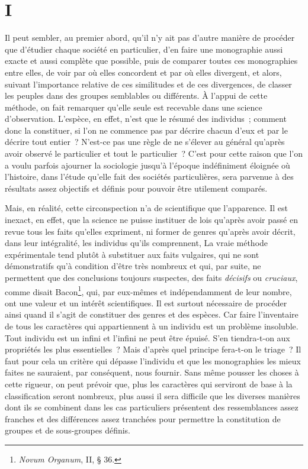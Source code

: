 \documentclass[french,twoside]{book} %
\begin{document}
\section[{I}]{I}
\noindent Il peut sembler, au premier abord, qu’il n’y ait pas d’autre manière de procéder que d’étudier chaque société en particulier, d’en faire une monographie aussi exacte et aussi complète que possible, puis de comparer toutes ces monographies entre elles, de voir par où elles concordent et par où elles divergent, et alors, suivant l’importance relative de ces similitudes et de ces divergences, de classer les peuples dans des groupes semblables ou différents. À l’appui de cette méthode, on fait remarquer qu’elle seule est recevable dans une science d’observation. L’espèce, en effet, n’est que le résumé des individus ; comment donc la constituer, si l’on ne commence pas par décrire chacun d’eux et par le décrire tout entier ? N’est-ce pas une règle de ne s’élever au général qu’après avoir observé le particulier et tout le particulier ? C’est pour cette raison que l’on a voulu parfois ajourner la sociologie jusqu’à l’époque indéfiniment éloignée où l’histoire, dans l’étude qu’elle fait des sociétés particulières, sera parvenue à des résultats assez objectifs et définis pour pouvoir être utilement comparés.\par
Mais, en réalité, cette circonspection n’a de scientifique que l’apparence. Il est inexact, en effet, que la science ne puisse instituer de lois qu’après avoir passé en revue tous les faits qu’elles expriment, ni former de genres qu’après avoir décrit, dans leur intégralité, les individus qu’ils comprennent, La vraie méthode expérimentale tend plutôt à substituer aux faits vulgaires, qui ne sont démonstratifs qu’à condition d’être très nombreux et qui, par suite, ne permettent que des conclusions toujours suspectes, des faits {\itshape décisifs} ou {\itshape cruciaux}, comme disait Bacon\footnote{\emph{Novum Organum}, II, § 36.}, qui, par eux-mêmes et indépendamment de leur nombre, ont une valeur et un intérêt scientifiques. Il est surtout nécessaire de procéder ainsi quand il s’agit de constituer des genres et des espèces. Car faire l’inventaire de tous les caractères qui appartiennent à un individu est un problème insoluble. Tout individu est un infini et l’infini ne peut être épuisé. S’en tiendra-t-on aux propriétés les plus essentielles ? Mais d’après quel principe fera-t-on le triage ? Il faut pour cela un critère qui dépasse l’individu et que les monographies les mieux faites ne sauraient, par conséquent, nous fournir. Sans même pousser les choses à cette rigueur, on peut prévoir que, plus les caractères qui serviront de base à la classification seront nombreux, plus aussi il sera difficile que les diverses manières dont ils se combinent dans les cas particuliers présentent des ressemblances assez franches et des différences assez tranchées pour permettre la constitution de groupes et de sous-groupes définis.\par
\end{document}
